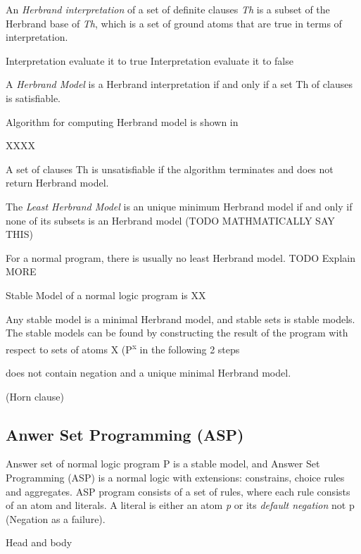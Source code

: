 \documentclass[12pt,twoside]{report}
\begin{document}
An \textit{Herbrand interpretation} of a set of definite clauses \textit{Th} is a subset of the Herbrand base of \textit{Th}, which is a set of ground atoms that are true in terms of interpretation.



Interpretation evaluate it to true
Interpretation evaluate it to false

A \textit{Herbrand Model} is a Herbrand interpretation if and only if a set Th of clauses is satisfiable.


Algorithm for computing Herbrand model is shown in

XXXX

A set of clauses Th is unsatisfiable if the algorithm terminates and does not return Herbrand model.

The \textit{Least Herbrand Model} is an unique minimum Herbrand model if and only if none of its subsets is an Herbrand model (TODO MATHMATICALLY SAY THIS)

For a normal program, there is usually no least Herbrand model.
TODO Explain MORE

Stable Model of a normal logic program is XX
\cite{Gelfond1988}

Any stable model is a minimal Herbrand model, and stable sets is stable models. The stable models can be found by constructing the result of the program with respect to sets of atoms X (P\textsuperscript{x} in the following 2 steps



does not contain negation and a unique minimal Herbrand model.

\begin{examp} (Horn clause)

\end{examp}



\subsection{Anwer Set Programming (ASP)}

Answer set of normal logic program P is a stable model, and Answer Set Programming (ASP) is a normal logic with extensions: constrains, choice rules and aggregates. ASP program consists of a set of rules, where each rule consists of an atom and literals.
A literal is either an atom \textit{p} or its \textit{default negation} not p (Negation as a failure).


Head and body
\end{document}
